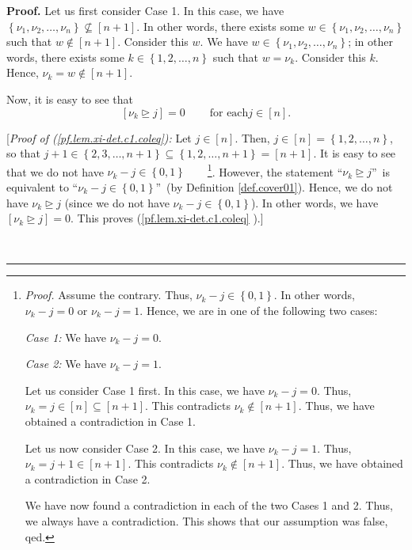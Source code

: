 \documentclass[numbers=enddot,12pt,final,onecolumn,notitlepage,english]{scrartcl}%
\theoremstyle{definition}
\newenvironment{proof}[1][Proof]{\noindent\textbf{#1.} }{\ \rule{0.5em}{0.5em}}
\newenvironment{verlong}{}{}
\begin{document}
\begin{proof}
\begin{verlong}
Let us first consider Case 1. In this case, we have $\left\{  \nu_{1},\nu
_{2},\ldots,\nu_{n}\right\}  \not \subseteq \left[  n+1\right]  $. In other
words, there exists some $w\in\left\{  \nu_{1},\nu_{2},\ldots,\nu_{n}\right\}
$ such that $w\notin\left[  n+1\right]  $. Consider this $w$. We have
$w\in\left\{  \nu_{1},\nu_{2},\ldots,\nu_{n}\right\}  $; in other words, there
exists some $k\in\left\{  1,2,\ldots,n\right\}  $ such that $w=\nu_{k}$.
Consider this $k$. Hence, $\nu_{k}=w\notin\left[  n+1\right]  $.

Now, it is easy to see that
\begin{equation}
\left[  \nu_{k}\trianglerighteq j\right]  =0\ \ \ \ \ \ \ \ \ \ \text{for each
}j\in\left[  n\right]  . \label{pf.lem.xi-det.c1.coleq}%
\end{equation}


[\textit{Proof of (\ref{pf.lem.xi-det.c1.coleq}):} Let $j\in\left[  n\right]
$. Then, $j\in\left[  n\right]  =\left\{  1,2,\ldots,n\right\}  $, so that
$j+1\in\left\{  2,3,\ldots,n+1\right\}  \subseteq\left\{  1,2,\ldots
,n+1\right\}  =\left[  n+1\right]  $. It is easy to see that we do not have
$\nu_{k}-j\in\left\{  0,1\right\}  $\ \ \ \ \footnote{\textit{Proof.} Assume
the contrary. Thus, $\nu_{k}-j\in\left\{  0,1\right\}  $. In other words,
$\nu_{k}-j=0$ or $\nu_{k}-j=1$. Hence, we are in one of the following two
cases:
\par
\textit{Case 1:} We have $\nu_{k}-j=0$.
\par
\textit{Case 2:} We have $\nu_{k}-j=1$.
\par
Let us consider Case 1 first. In this case, we have $\nu_{k}-j=0$. Thus,
$\nu_{k}=j\in\left[  n\right]  \subseteq\left[  n+1\right]  $. This
contradicts $\nu_{k}\notin\left[  n+1\right]  $. Thus, we have obtained a
contradiction in Case 1.
\par
Let us now consider Case 2. In this case, we have $\nu_{k}-j=1$. Thus,
$\nu_{k}=j+1\in\left[  n+1\right]  $. This contradicts $\nu_{k}\notin\left[
n+1\right]  $. Thus, we have obtained a contradiction in Case 2.
\par
We have now found a contradiction in each of the two Cases 1 and 2. Thus, we
always have a contradiction. This shows that our assumption was false, qed.}.
However, the statement \textquotedblleft$\nu_{k}\trianglerighteq
j$\textquotedblright\ is equivalent to \textquotedblleft$\nu_{k}-j\in\left\{
0,1\right\}  $\textquotedblright\ (by Definition \ref{def.cover01}). Hence, we
do not have $\nu_{k}\trianglerighteq j$ (since we do not have $\nu_{k}%
-j\in\left\{  0,1\right\}  $). In other words, we have $\left[  \nu
_{k}\trianglerighteq j\right]  =0$. This proves (\ref{pf.lem.xi-det.c1.coleq}%
).] \medskip


\end{verlong}
\end{proof}
\end{document}
